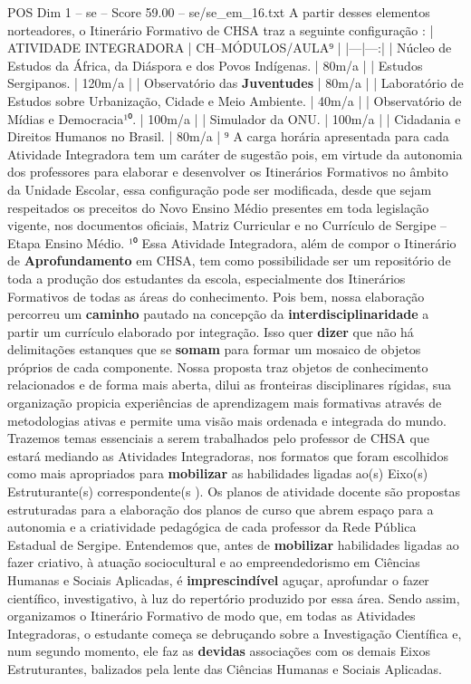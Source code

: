 \begin{textsample}{POS Dim 1 – se – Score 59.00 – se/se\_em\_16.txt}
A partir desses elementos norteadores, o Itinerário Formativo de CHSA traz a seguinte configuração : | ATIVIDADE INTEGRADORA | CH–MÓDULOS/AULA⁹ | |---|---:| | Núcleo de Estudos da África, da Diáspora e dos Povos Indígenas. | 80m/a | | Estudos Sergipanos. | 120m/a | | Observatório das \textbf{Juventudes} | 80m/a | | Laboratório de Estudos sobre Urbanização, Cidade e Meio Ambiente. | 40m/a | | Observatório de Mídias e Democracia¹⁰. | 100m/a | | Simulador da ONU. | 100m/a | | Cidadania e Direitos Humanos no Brasil. | 80m/a | ⁹ A carga horária apresentada para cada Atividade Integradora tem um caráter de sugestão pois, em virtude da autonomia dos professores para elaborar e desenvolver os Itinerários Formativos no âmbito da Unidade Escolar, essa configuração pode ser modificada, desde que sejam respeitados os preceitos do Novo Ensino Médio presentes em toda legislação vigente, nos documentos oficiais, Matriz Curricular e no Currículo de Sergipe – Etapa Ensino Médio. ¹⁰ Essa Atividade Integradora, além de compor o Itinerário de \textbf{Aprofundamento} em CHSA, tem como possibilidade ser um repositório de toda a produção dos estudantes da escola, especialmente dos Itinerários Formativos de todas as áreas do conhecimento.
Pois bem, nossa elaboração percorreu um \textbf{caminho} pautado na concepção da \textbf{interdisciplinaridade} a partir um currículo elaborado por integração.
Isso quer \textbf{dizer} que não há delimitações estanques que se \textbf{somam} para formar um mosaico de objetos próprios de cada componente.
Nossa proposta traz objetos de conhecimento relacionados e de forma mais aberta, dilui as fronteiras disciplinares rígidas, sua organização propicia experiências de aprendizagem mais formativas através de metodologias ativas e permite uma visão mais ordenada e integrada do mundo.
Trazemos temas essenciais a serem trabalhados pelo professor de CHSA que estará mediando as Atividades Integradoras, nos formatos que foram escolhidos como mais apropriados para \textbf{mobilizar} as habilidades ligadas ao(s) Eixo(s) Estruturante(s) correspondente(s ).
Os planos de atividade docente são propostas estruturadas para a elaboração dos planos de curso que abrem espaço para a autonomia e a criatividade pedagógica de cada professor da Rede Pública Estadual de Sergipe.
Entendemos que, antes de \textbf{mobilizar} habilidades ligadas ao fazer criativo, à atuação sociocultural e ao empreendedorismo em Ciências Humanas e Sociais Aplicadas, é \textbf{imprescindível} aguçar, aprofundar o fazer científico, investigativo, à luz do repertório produzido por essa área.
Sendo assim, organizamos o Itinerário Formativo de modo que, em todas as Atividades Integradoras, o estudante começa se debruçando sobre a Investigação Científica e, num segundo momento, ele faz as \textbf{devidas} associações com os demais Eixos Estruturantes, balizados pela lente das Ciências Humanas e Sociais Aplicadas.

\end{textsample}
